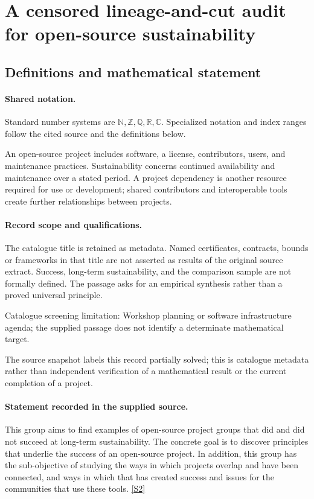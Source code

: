 \documentclass[11pt]{article}
\newcommand{\sref}[2]{\hyperlink{source:#1:#2}{[S#2]}}
\begin{document}
\section{A censored lineage-and-cut audit for open-source sustainability}\label{statement}

\subsection{Definitions and mathematical statement}

\paragraph{Shared notation.}Standard number systems are $\mathbb N,\mathbb Z,\mathbb Q,\mathbb R,\mathbb C$. Specialized notation and index ranges follow the cited source and the definitions below.


An open-source project includes software, a license, contributors, users, and maintenance practices. Sustainability concerns continued availability and maintenance over a stated period. A project dependency is another resource required for use or development; shared contributors and interoperable tools create further relationships between projects.
\paragraph{Record scope and qualifications.}
The catalogue title is retained as metadata. Named certificates, contracts, bounds or frameworks in that title are not asserted as results of the original source extract.
Success, long-term sustainability, and the comparison sample are not formally defined. The passage asks for an empirical synthesis rather than a proved universal principle.

Catalogue screening limitation: Workshop planning or software infrastructure agenda; the supplied passage does not identify a determinate mathematical target.

The source snapshot labels this record partially solved; this is catalogue metadata rather than independent verification of a mathematical result or the current completion of a project.
\paragraph{Statement recorded in the supplied source.}
This group aims to find examples of open-source project groups that did and did not succeed at long-term sustainability. The concrete goal is to discover principles that underlie the success of an open-source project. In addition, this group has the sub-objective of studying the ways in which projects overlap and have been connected, and ways in which that has created success and issues for the communities that use these tools. \sref{statement}{2}
\end{document}
